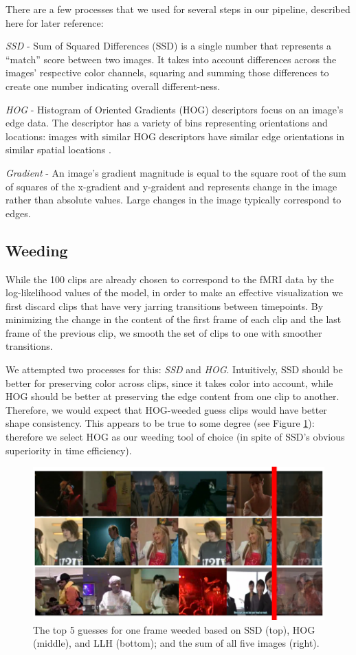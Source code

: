 There are a few processes that we used for several steps in our pipeline, described here for later reference:

\emph{SSD} - Sum of Squared Differences (SSD) is a single number that represents a ``match'' score between two images.  It takes into account differences across the images' respective color channels, squaring and summing those differences to create one number indicating overall different-ness.

\emph{HOG} - Histogram of Oriented Gradients (HOG) descriptors focus on an image's edge data.  The descriptor has a variety of bins representing orientations and locations: images with similar HOG descriptors have similar edge orientations in similar spatial locations \cite{HOG}.

\emph{Gradient} - An image's gradient magnitude is equal to the square root of the sum of squares of the x-gradient and y-graident and represents change in the image rather than absolute values.  Large changes in the image typically correspond to edges.

\subsection{Weeding}
While the 100 clips are already chosen to correspond to the fMRI data by the log-likelihood values of the model, in order to make an effective visualization we first discard clips that have very jarring transitions between timepoints. By minimizing the change in the content of the first frame of each clip and the last frame of the previous clip, we smooth the set of clips to one with smoother transitions.

We attempted two processes for this: \emph{SSD} and \emph{HOG}.  Intuitively, SSD should be better for preserving color across clips, since it takes color into account, while HOG should be better at preserving the edge content from one clip to another.  Therefore, we would expect that HOG-weeded guess clips would have better shape consistency.  This appears to be true to some degree (see Figure \ref{fig:weeding}): therefore we select HOG as our weeding tool of choice (in spite of SSD's obvious superiority in time efficiency).

\begin{figure}
\centering
    \includegraphics[width=1.0\columnwidth]{figures/preproc.png}
\caption{The top 5 guesses for one frame weeded based on SSD (top), HOG (middle), and LLH (bottom); and the sum of all five images (right).}
\label{fig:weeding}
\end{figure}

